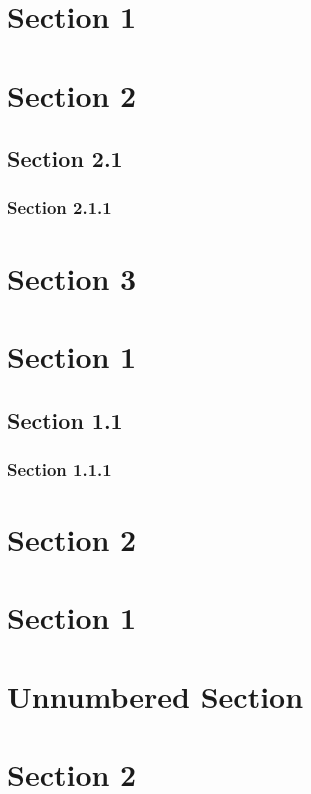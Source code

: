 \section*{\hypertarget{_section_1}{Section 1}}
\section*{\hypertarget{_section_2}{Section 2}}
\subsection*{\hypertarget{_section_2.1}{Section 2.1}}
\subsubsection*{\hypertarget{_section_2.1.1}{Section 2.1.1}}
\section*{\hypertarget{_section_3}{Section 3}}

\section*{\hypertarget{_section_1}{Section 1}}
\subsection*{\hypertarget{_section_1.1}{Section 1.1}}
\subsubsection*{\hypertarget{_section_1.1.1}{Section 1.1.1}}
\section*{\hypertarget{_section_2}{Section 2}}

\section{\hypertarget{_section_1}{Section 1}}
\section*{\hypertarget{_unnumbered_section}{Unnumbered Section}}
\section{\hypertarget{_section_2}{Section 2}}
